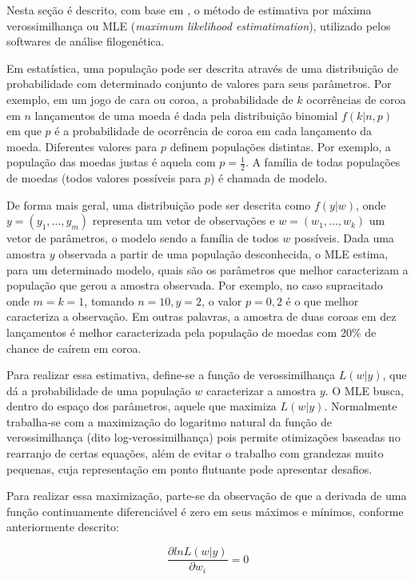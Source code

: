 \documentclass[cic,tc]{iiufrgs}
\begin{document}
Nesta seção é descrito, com base em \cite{myung2003tutorial}, o método de
estimativa por máxima verossimilhança ou MLE (\textit{maximum likelihood
estimatimation}), utilizado pelos softwares de análise filogenética.

Em estatística, uma população pode ser descrita através de uma distribuição de
probabilidade com determinado conjunto de valores para seus parâmetros.
Por exemplo, em um jogo de cara ou coroa, a probabilidade de $k$ ocorrências de
coroa em $n$ lançamentos de uma moeda é dada pela distribuição binomial
$f(k|n,p)$ em que $p$ é a probabilidade de ocorrência de coroa em cada
lançamento da moeda. Diferentes valores para $p$ definem populações distintas.
Por exemplo, a população das moedas justas é aquela com $p = \frac{1}{2}$. A
família de todas populações de moedas (todos valores possíveis para $p$) é
chamada de modelo.

De forma mais geral, uma distribuição pode ser descrita como $f(y|w)$, onde $y
= (y_1, ..., y_m)$ representa um vetor de observações e $w = (w_1, ..., w_k)$
um vetor de parâmetros, o modelo sendo a família de todos $w$ possíveis. Dada
uma amostra $y$ observada a partir de uma população desconhecida, o MLE estima,
para um determinado modelo, quais são os parâmetros que melhor caracterizam a
população que gerou a amostra observada. Por exemplo, no caso supracitado
onde $m = k = 1$, tomando $n = 10, y = 2$, o valor $p = 0{,}2$ é o que melhor
caracteriza a observação. Em outras palavras, a amostra de duas coroas em dez
lançamentos é melhor caracterizada pela população de moedas com 20\% de chance
de caírem em coroa.

Para realizar essa estimativa, define-se a função de verossimilhança $L(w|y)$,
que dá a probabilidade de uma população $w$ caracterizar a amostra $y$. O MLE
busca, dentro do espaço dos parâmetros, aquele que maximiza $L(w|y)$.
Normalmente trabalha-se com a maximização do logaritmo natural da função de
verossimilhança (dito log-verossimilhança) pois permite otimizações baseadas no
rearranjo de certas equações, além de evitar o trabalho com grandezas muito
pequenas, cuja representação em ponto flutuante pode apresentar desafios.

Para realizar essa maximização, parte-se da observação de que a derivada de uma
função continuamente diferenciável é zero em seus máximos e mínimos, conforme
anteriormente descrito:

\begin{equation}
\label{eq:dl}
\frac{\partial ln L(w|y)}{\partial w_i} = 0
\end{equation}
\end{document}
